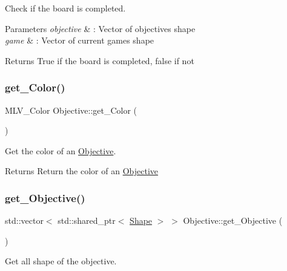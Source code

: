Check if the board is completed. 


\begin{DoxyParams}{Parameters}
{\em objective} & \+: Vector of objective\textquotesingle{}s shape \\
\hline
{\em game} & \+: Vector of current game\textquotesingle{}s shape \\
\hline
\end{DoxyParams}
\begin{DoxyReturn}{Returns}
True if the board is completed, false if not 
\end{DoxyReturn}
\mbox{\label{classObjective_ae20161454cf0dd248b8e17989044eb13}} 
\subsubsection{\texorpdfstring{get\+\_\+\+Color()}{get\_Color()}}
{\footnotesize\ttfamily M\+L\+V\+\_\+\+Color Objective\+::get\+\_\+\+Color (\begin{DoxyParamCaption}{ }\end{DoxyParamCaption})}



Get the color of an \hyperlink{classObjective}{Objective}. 

\begin{DoxyReturn}{Returns}
Return the color of an \hyperlink{classObjective}{Objective} 
\end{DoxyReturn}
\mbox{\label{classObjective_a9d379ffa32a62fbb5e5df62a88201baf}} 
\subsubsection{\texorpdfstring{get\+\_\+\+Objective()}{get\_Objective()}}
{\footnotesize\ttfamily std\+::vector$<$ std\+::shared\+\_\+ptr$<$ \hyperlink{classShape}{Shape} $>$ $>$ Objective\+::get\+\_\+\+Objective (\begin{DoxyParamCaption}{ }\end{DoxyParamCaption})}



Get all shape of the objective. 

